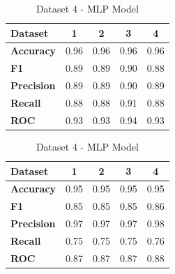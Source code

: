 \begin{table}[H]
\begin{subtable}[H]{0.45\textwidth}
\begin{tabular}{|l|c|c|c|c|}
            \hline
            \textbf{Dataset} & \textbf{1} & \textbf{2} & \textbf{3} & \textbf{4} \\
            \hline
            \textbf{Accuracy} & 0.96 & 0.96 & 0.96 & 0.96 \\
            \textbf{F1} & 0.89 & 0.89 & 0.90 & 0.88 \\
            \textbf{Precision} & 0.89 & 0.89 & 0.90 & 0.89 \\
            \textbf{Recall} & 0.88 & 0.88 & 0.91 & 0.88 \\
            \textbf{ROC} & 0.93 & 0.93 & 0.94 & 0.93 \\
            \hline
        \end{tabular}
        \caption{Dataset 3 - MLP Model}\label{subtab:dataset_3_mlp_model}
    \end{subtable}
    \quad
    \begin{subtable}[H]{0.45\textwidth}
        \centering
        \begin{tabular}{|l|c|c|c|c|}
            \hline
            \textbf{Dataset} & \textbf{1} & \textbf{2} & \textbf{3} & \textbf{4} \\
            \hline
            \textbf{Accuracy} & 0.95 & 0.95 & 0.95 & 0.95 \\
            \textbf{F1} & 0.85 & 0.85 & 0.85 & 0.86 \\
            \textbf{Precision} & 0.97 & 0.97 & 0.97 & 0.98 \\
            \textbf{Recall} & 0.75 & 0.75 & 0.75 & 0.76 \\
            \textbf{ROC} & 0.87 & 0.87 & 0.87 & 0.88 \\
            \hline
        \end{tabular}
        \caption{Dataset 4 - MLP Model}\label{subtab:dataset_4_mlp_model}
    \end{subtable}
\end{table}

